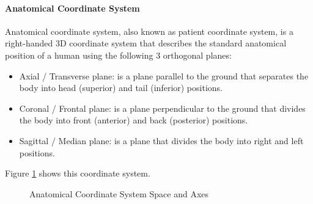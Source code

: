\documentclass[12pt]{article}
\begin{document}
\paragraph{Anatomical Coordinate System}
Anatomical coordinate system, also known as patient coordinate system, is a right-handed 3D coordinate system that describes the standard anatomical position of a human using the following 3 orthogonal planes:
\begin{itemize}
\item{Axial / Transverse plane:} is a plane parallel to the ground that separates the body into head (superior) and tail (inferior) positions.
\item{Coronal / Frontal plane:} is a plane perpendicular to the ground that divides the body into front (anterior) and back (posterior) positions.
\item{Sagittal / Median plane:} is a plane that divides the body into right and left positions.
\end{itemize}
Figure \ref{ACS} shows this coordinate system.

\begin{figure}[htbp!] 
\centering
{}

\caption{Anatomical Coordinate System Space and Axes~\cite{slicerWCS}} %
\label{ACS}
\end{figure}
\indent
\end{document}
